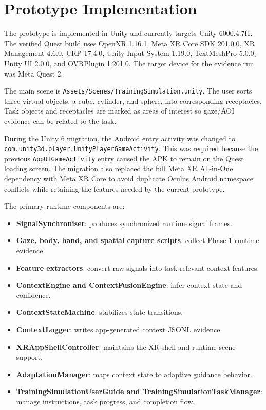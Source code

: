 \documentclass[conference]{IEEEtran}
\begin{document}
\section{Prototype Implementation}
The prototype is implemented in Unity and currently targets Unity 6000.4.7f1. The verified Quest build uses OpenXR 1.16.1, Meta XR Core SDK 201.0.0, XR Management 4.6.0, URP 17.4.0, Unity Input System 1.19.0, TextMeshPro 5.0.0, Unity UI 2.0.0, and OVRPlugin 1.201.0. The target device for the evidence run was Meta Quest 2.

The main scene is \texttt{Assets/Scenes/TrainingSimulation.unity}. The user sorts three virtual objects, a cube, cylinder, and sphere, into corresponding receptacles. Task objects and receptacles are marked as areas of interest so gaze/AOI evidence can be related to the task.

During the Unity 6 migration, the Android entry activity was changed to \texttt{com.unity3d.player.UnityPlayerGameActivity}. This was required because the previous \texttt{AppUIGameActivity} entry caused the APK to remain on the Quest loading screen. The migration also replaced the full Meta XR All-in-One dependency with Meta XR Core to avoid duplicate Oculus Android namespace conflicts while retaining the features needed by the current prototype.

The primary runtime components are:
\begin{itemize}
\item \textbf{SignalSynchroniser}: produces synchronized runtime signal frames.
\item \textbf{Gaze, body, hand, and spatial capture scripts}: collect Phase 1 runtime evidence.
\item \textbf{Feature extractors}: convert raw signals into task-relevant context features.
\item \textbf{ContextEngine and ContextFusionEngine}: infer context state and confidence.
\item \textbf{ContextStateMachine}: stabilizes state transitions.
\item \textbf{ContextLogger}: writes app-generated context JSONL evidence.
\item \textbf{XRAppShellController}: maintains the XR shell and runtime scene support.
\item \textbf{AdaptationManager}: maps context state to adaptive guidance behavior.
\item \textbf{TrainingSimulationUserGuide and TrainingSimulationTaskManager}: manage instructions, task progress, and completion flow.
\end{itemize}
\end{document}
